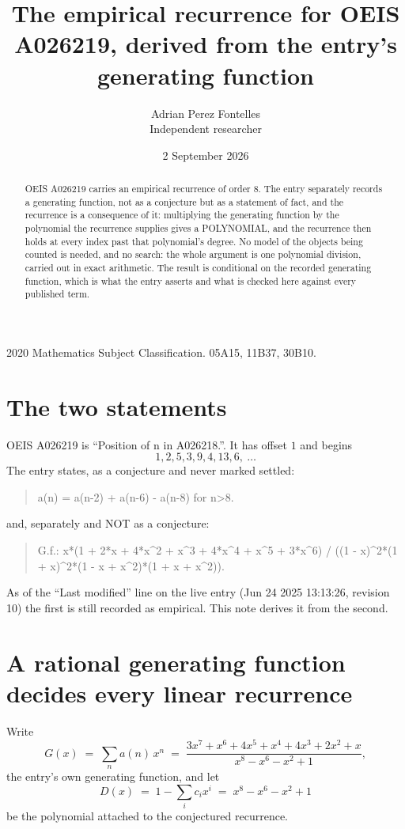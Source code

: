 \documentclass[11pt,a4paper]{article}
\title{The empirical recurrence for OEIS A026219, derived from the entry's generating function}
\author{Adrian Perez Fontelles\\ \small Independent researcher}
\date{2 September 2026}
\theoremstyle{plain}
\theoremstyle{definition}
\begin{document}
\maketitle

\begin{abstract}
OEIS A026219 carries an empirical recurrence of order $8$. The entry separately records a
generating function, not as a conjecture but as a statement of fact, and the recurrence is a
consequence of it: multiplying the generating function by the polynomial the recurrence
supplies gives a POLYNOMIAL, and the recurrence then holds at every index past that
polynomial's degree. No model of the objects being counted is needed, and no search: the
whole argument is one polynomial division, carried out in exact arithmetic. The result is
conditional on the recorded generating function, which is what the entry asserts and what is
checked here against every published term.
\end{abstract}

\noindent\small 2020 Mathematics Subject Classification. 05A15, 11B37, 30B10.\normalsize

\section{The two statements}

OEIS A026219 is ``Position of n in A026218.''. It has offset $1$ and begins
\[
1, 2, 5, 3, 9, 4, 13, 6,\ \dots
\]
The entry states, as a conjecture and never marked settled:
\begin{quote}
a(n) = a(n-2) + a(n-6) - a(n-8) for n>8.
\end{quote}
and, separately and NOT as a conjecture:
\begin{quote}
G.f.: x*(1 + 2*x + 4*x\^{}2 + x\^{}3 + 4*x\^{}4 + x\^{}5 + 3*x\^{}6) / ((1 - x)\^{}2*(1 + x)\^{}2*(1 - x + x\^{}2)*(1 + x + x\^{}2)).
\end{quote}
As of the ``Last modified'' line on the live entry (Jun 24 2025 13:13:26, revision 10) the first is still
recorded as empirical. This note derives it from the second.

\section{A rational generating function decides every linear recurrence}

Write
\[
G(x)\;=\;\sum_{n}a(n)\,x^{n}\;=\;\frac{3 x^{7} + x^{6} + 4 x^{5} + x^{4} + 4 x^{3} + 2 x^{2} + x}{x^{8} - x^{6} - x^{2} + 1},
\]
the entry's own generating function, and let
\[
D(x)\;=\;1-\sum_i c_i x^{i}\;=\;x^{8} - x^{6} - x^{2} + 1
\]
be the polynomial attached to the conjectured recurrence.
\end{document}
